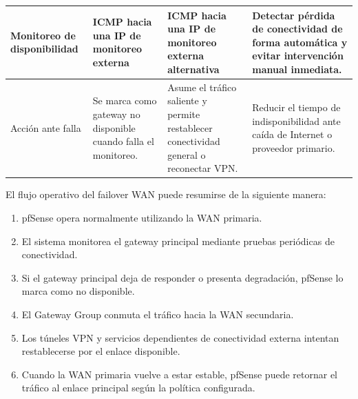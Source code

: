 \documentclass[11pt, a4paper, oneside]{report}
\begin{document}
\begin{xltabular}{\textwidth}{@{}|L{3.2cm}|L{4cm}|L{4cm}|X|@{}}
{\small Monitoreo de disponibilidad} &
{\small ICMP hacia una IP de monitoreo externa} &
{\small ICMP hacia una IP de monitoreo externa alternativa} &
{\small Detectar pérdida de conectividad de forma automática y evitar intervención manual inmediata.} \\ \hline

{\small Acción ante falla} &
{\small Se marca como gateway no disponible cuando falla el monitoreo.} &
{\small Asume el tráfico saliente y permite restablecer conectividad general o reconectar VPN.} &
{\small Reducir el tiempo de indisponibilidad ante caída de Internet o proveedor primario.} \\ \hline

\end{xltabular}

\normalsize

El flujo operativo del failover WAN puede resumirse de la siguiente manera:

\begin{enumerate}
    \item pfSense opera normalmente utilizando la WAN primaria.
    \item El sistema monitorea el gateway principal mediante pruebas periódicas de conectividad.
    \item Si el gateway principal deja de responder o presenta degradación, pfSense lo marca como no disponible.
    \item El Gateway Group conmuta el tráfico hacia la WAN secundaria.
    \item Los túneles VPN y servicios dependientes de conectividad externa intentan restablecerse por el enlace disponible.
    \item Cuando la WAN primaria vuelve a estar estable, pfSense puede retornar el tráfico al enlace principal según la política configurada.
\end{enumerate}

\renewcommand{\arraystretch}{1.3}
\footnotesize
{}
\end{document}
